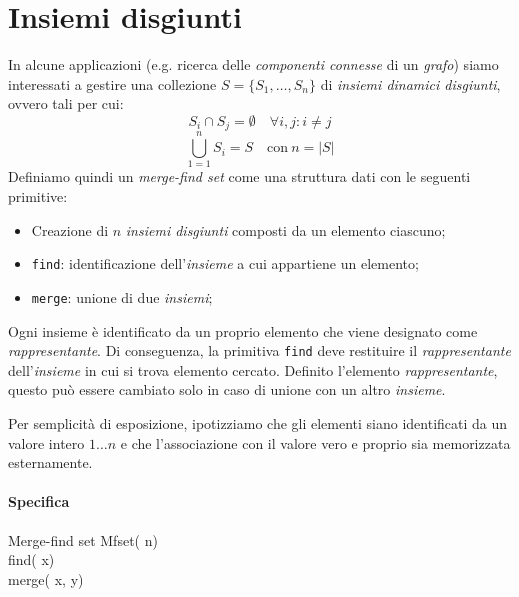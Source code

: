 \section{Insiemi disgiunti}
In alcune applicazioni (e.g. ricerca delle \emph{componenti connesse} di un
\emph{grafo}) siamo interessati a gestire una collezione $S=\{S_1,\dots,
S_n\}$ di \emph{insiemi dinamici disgiunti}, ovvero tali per cui:
\[S_i\cap S_j=\emptyset\quad\forall i,j : i\neq j\]
\[\bigcup_{1=1}^n S_i=S\quad\text{con}\ n=\left|S\right|\]
Definiamo quindi un \emph{merge-find set} come una struttura dati con le
seguenti primitive:
\begin{itemize}
    \item Creazione di $n$ \emph{insiemi disgiunti} composti da un elemento
    ciascuno;
    \item \texttt{find}: identificazione dell'\emph{insieme} a cui appartiene un
    elemento;
    \item \texttt{merge}: unione di due \emph{insiemi};
\end{itemize}\noindent
Ogni insieme è identificato da un proprio elemento che viene designato come
\emph{rappresentante}. Di conseguenza, la primitiva \texttt{find} deve restituire
il \emph{rappresentante} dell'\emph{insieme} in cui si trova elemento cercato.
Definito l'elemento \emph{rappresentante}, questo può essere cambiato solo in
caso di unione con un altro \emph{insieme}.

\begin{note}
    Per semplicità di esposizione, ipotizziamo che gli elementi siano identificati
    da un valore intero $1\dots n$ e che l'associazione con il valore vero e
    proprio sia memorizzata esternamente.
\end{note}

\paragraph{Specifica}
\begin{code}{Merge-find set}
     Mfset( n)\\
     find( x)\\
    merge( x,  y)
\end{code}

